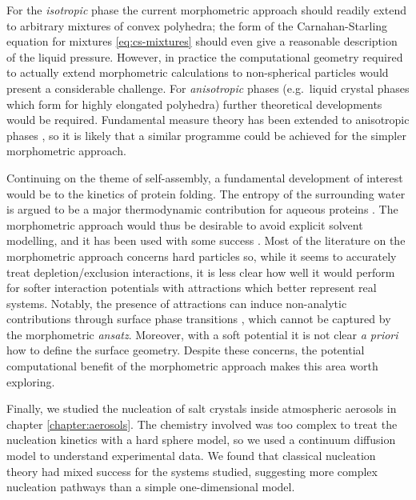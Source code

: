 \documentclass[11pt,twoside]{report}
\begin{document}
For the \emph{isotropic} phase the current morphometric approach should readily extend to arbitrary mixtures of convex polyhedra; the form of the Carnahan-Starling equation for mixtures \eqref{eq:cs-mixtures} should even give a reasonable description of the liquid pressure.
However, in practice the computational geometry required to actually extend morphometric calculations to non-spherical particles would present a considerable challenge.
For \emph{anisotropic} phases (e.g.\ liquid crystal phases which form for highly elongated polyhedra) further theoretical developments would be required.
Fundamental measure theory has been extended to anisotropic phases \cite{Hansen-GoosPRL2009,Hansen-GoosJPCM2010,WittmannEL2015,WittmannPRE2015,WittmannJPCM2016}, so it is likely that a similar programme could be achieved for the simpler morphometric approach.

Continuing on the theme of self-assembly, a fundamental development of interest would be to the kinetics of protein folding.
The entropy of the surrounding water is argued to be a major thermodynamic contribution for aqueous proteins \cite{HaranoCPL2004,HaranoBJ2005,KinoshitaCES2006}.
The morphometric approach would thus be desirable to avoid explicit solvent modelling, and it has been used with some success \cite{HaranoCPL2006,RothPRL2006,KodamaJCP2011}.
Most of the literature on the morphometric approach concerns hard particles so, while it seems to accurately treat depletion/exclusion interactions, it is less clear how well it would perform for softer interaction potentials with attractions which better represent real systems.
Notably, the presence of attractions can induce non-analytic contributions through surface phase transitions \cite{EvansELE2003,EvansJCP2004}, which cannot be captured by the morphometric \emph{ansatz}.
Moreover, with a soft potential it is not clear \emph{a priori} how to define the surface geometry.
Despite these concerns, the potential computational benefit of the morphometric approach makes this area worth exploring.

Finally, we studied the nucleation of salt crystals inside atmospheric aerosols in chapter \ref{chapter:aerosols}.
The chemistry involved was too complex to treat the nucleation kinetics with a hard sphere model, so we used a continuum diffusion model to understand experimental data.
We found that classical nucleation theory had mixed success for the systems studied, suggesting more complex nucleation pathways than a simple one-dimensional model.
\end{document}
